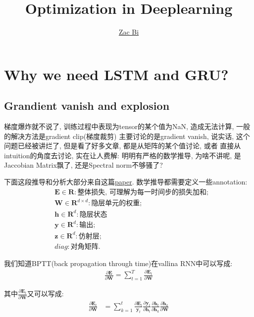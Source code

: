 \documentclass{article}
\begin{document}
\begin{titlepage}
    \title{Optimization in Deeplearning}
    \author{\href{https://github.com/ZacBi}{Zac Bi}}
    \maketitle
    \pagestyle{empty}
\end{titlepage}

\section{Why we need LSTM and GRU?}

\subsection{Grandient vanish and explosion}

梯度爆炸就不说了, 训练过程中表现为tensor的某个值为NaN, 造成无法计算, 一般的解决方法是gradient clip(梯度裁剪)
主要讨论的是gradient vanish, 说实话, 这个问题已经被讲烂了, 但是看了好多文章, 都是从矩阵的某个值讨论, 或者
直接从intuition的角度去讨论, 实在让人费解: 明明有严格的数学推导, 为啥不讲呢, 是Jaccobian Matrix飘了, 还是Spectral norm不够骚了?

下面这段推导和分析大部分来自这篇\href{https://arxiv.org/pdf/1211.5063.pdf}{paper}.
数学推导都需要定义一些annotation:
\begin{align*}
     & \textbf{E} \in \textbf{R}: \text{整体损失, 可理解为每一时间步的损失加和;} \\
     & \textbf{W} \in \textbf{R}^{d \times d}: \text{隐层单元的权重;}            \\
     & \textbf{h} \in \textbf{R}^d: \text{隐层状态}                              \\
     & \textbf{y} \in \textbf{R}^d: \text{输出;}                                 \\
     & \textbf{z} \in \textbf{R}^d: \text{仿射层;}                               \\
     & diag: \text{对角矩阵.}
\end{align*}

我们知道BPTT(back propagation through time)在vallina RNN中可以写成:
\begin{align}
    \frac{\partial \textbf{E}}{\partial \textbf{W}} = \sum_{t=1}^{T} \frac{\partial \textbf{E}_t}{\partial \textbf{W}}
\end{align}

其中$\frac{\partial \textbf{E}_t}{\partial \textbf{W}}$又可以写成:
\begin{align}
    \frac{\partial \textbf{E}_t}{\partial \textbf{W}} & = \sum_{k=1}^{t} \frac{\partial \textbf{E}_t}{\textbf{y}_t}
    \frac{\partial \textbf{y}_t}{\partial \textbf{h}_t} \frac{\partial \textbf{h}_t}{\partial \textbf{h}_k}
    \frac{\partial \textbf{h}_k}{\partial \textbf{W}}
\end{align}
\end{document}
